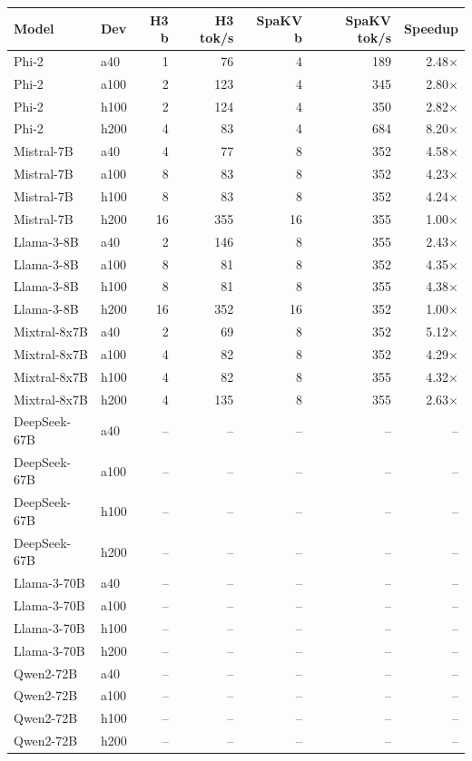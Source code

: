 \begin{tabular}{llrrrrr}
\toprule
Model & Dev & H3 b & H3 tok/s & SpaKV b & SpaKV tok/s & Speedup\\
\midrule
Phi-2 & a40 & 1 & 76 & 4 & 189 & 2.48$\times$\\
Phi-2 & a100 & 2 & 123 & 4 & 345 & 2.80$\times$\\
Phi-2 & h100 & 2 & 124 & 4 & 350 & 2.82$\times$\\
Phi-2 & h200 & 4 & 83 & 4 & 684 & 8.20$\times$\\
Mistral-7B & a40 & 4 & 77 & 8 & 352 & 4.58$\times$\\
Mistral-7B & a100 & 8 & 83 & 8 & 352 & 4.23$\times$\\
Mistral-7B & h100 & 8 & 83 & 8 & 352 & 4.24$\times$\\
Mistral-7B & h200 & 16 & 355 & 16 & 355 & 1.00$\times$\\
Llama-3-8B & a40 & 2 & 146 & 8 & 355 & 2.43$\times$\\
Llama-3-8B & a100 & 8 & 81 & 8 & 352 & 4.35$\times$\\
Llama-3-8B & h100 & 8 & 81 & 8 & 355 & 4.38$\times$\\
Llama-3-8B & h200 & 16 & 352 & 16 & 352 & 1.00$\times$\\
Mixtral-8x7B & a40 & 2 & 69 & 8 & 352 & 5.12$\times$\\
Mixtral-8x7B & a100 & 4 & 82 & 8 & 352 & 4.29$\times$\\
Mixtral-8x7B & h100 & 4 & 82 & 8 & 355 & 4.32$\times$\\
Mixtral-8x7B & h200 & 4 & 135 & 8 & 355 & 2.63$\times$\\
DeepSeek-67B & a40 & -- & -- & -- & -- & --\\
DeepSeek-67B & a100 & -- & -- & -- & -- & --\\
DeepSeek-67B & h100 & -- & -- & -- & -- & --\\
DeepSeek-67B & h200 & -- & -- & -- & -- & --\\
Llama-3-70B & a40 & -- & -- & -- & -- & --\\
Llama-3-70B & a100 & -- & -- & -- & -- & --\\
Llama-3-70B & h100 & -- & -- & -- & -- & --\\
Llama-3-70B & h200 & -- & -- & -- & -- & --\\
Qwen2-72B & a40 & -- & -- & -- & -- & --\\
Qwen2-72B & a100 & -- & -- & -- & -- & --\\
Qwen2-72B & h100 & -- & -- & -- & -- & --\\
Qwen2-72B & h200 & -- & -- & -- & -- & --\\
\bottomrule
\end{tabular}
